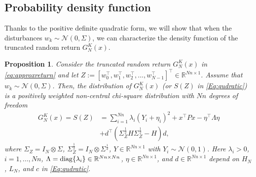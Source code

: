 \documentclass[letterpaper, 10 pt, conference]{ieeeconf}  %
\newtheorem{proposition}{Proposition}[section]
\begin{document}
\subsection{Probability density function}
Thanks to the positive definite quadratic form, we will show that when the disturbances $w_k\sim \mathcal{N}(0,\Sigma)$, we can characterize the density function of the truncated random return $G^K_N(x)$. 
 
\begin{proposition}\label{The:density}
Consider the truncated random return $G^K_N(x)$ in \eqref{eq:approxreturn} and let $Z:=\left[w_0^\top,w_1^\top,w_2^\top,...,w_{N-1}^\top\right]^\top\in \mathbb{R}^{N n\times 1}$.  Assume that  $w_k\sim \mathcal{N}(0,\Sigma)$. Then, the distribution of  $G_{N}^{K}(x) $ (or $S(Z)$ in \eqref{Eq:qudratic}) is a positively weighted non-central chi-square distribution with $Nn$ degrees of freedom
    \begin{equation}
        \begin{aligned}
            G_{N}^{K}(x)=S(Z)&=\sum_{i=1}^{Nn}\lambda_i\left( Y_i+\eta_i \right)^2+x^\top Px-\eta^\top \Lambda \eta\\&+d^\top (\Sigma_Z^{\frac{1}{2}} H \Sigma_Z^{\frac{1}{2}}-H)d,
        \end{aligned}
    \end{equation}
where $\Sigma_Z=I_N\otimes \Sigma$, $\Sigma_Z^{\frac{1}{2}}=I_N \otimes \Sigma^{\frac{1}{2}}$, $Y\in \mathbb{R}^{Nn\times1}$ with $Y_i\sim
\mathcal{N}(0,1)$. Here $\lambda_i>0$, $i=1,\dots, Nn$, $\Lambda = {\rm diag}\{\lambda_i\}\in \mathbb{R}^{Nn\times Nn}$,  $\eta \in \mathbb{R}^{Nn\times1}$, and $d\in \mathbb{R}^{Nn\times1}$ depend on $H_N$, $L_N$, and $c$ in \eqref{Eq:qudratic}. 
\end{proposition}
\end{document}
